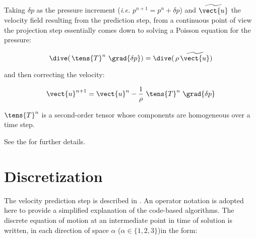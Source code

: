 Taking $\delta p$ as the pressure increment ({\it i.e.} $p^{n+1} = p^n+\delta p$) and $\widetilde{\vect{u}}$ the velocity field resulting from the prediction step, from a continuous point of view the projection step essentially comes down to solving a Poisson equation for the pressure:

\begin{equation}
  \dive(\,{\tens{T}^n\ \grad{\delta p}}) = \dive(\,{\rho \,\widetilde{\vect{u}}})
\end{equation}

and then correcting the velocity:

\begin{equation}
\vect{u}^{n+1} = \vect{u}^n - \frac{1}{\rho}\ \tens{T}^n\ \grad{\delta p}
\end{equation}

$\tens{T}^n$ is a second-order tensor whose components are homogeneous over a time step.

See the  for further details.

\section*{Discretization}
The velocity prediction step is described in . An operator notation is adopted here to provide a simplified explanation of the code-based algorithms.
The discrete equation of motion at an intermediate point in time of solution is written, in each direction of space $\alpha$ ($\alpha \in \{1,2,3\}$)in the form:

